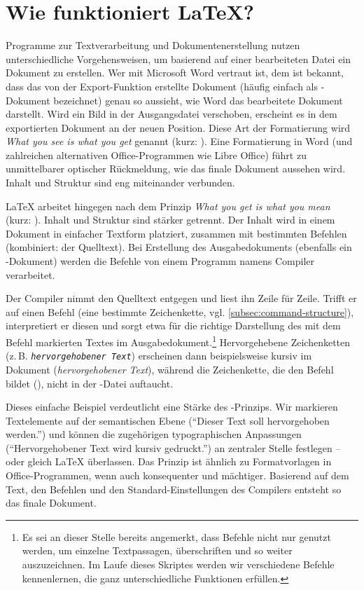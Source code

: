 \section{Wie funktioniert \LaTeX?}
\label{sec:latex-basic-functionality}

Programme zur Textverarbeitung und Dokumentenerstellung nutzen unterschiedliche Vorgehensweisen, um basierend auf einer bearbeiteten Datei ein Dokument zu erstellen.
Wer mit Microsoft Word vertraut ist, dem ist bekannt, dass das von der Export-Funktion erstellte Dokument (häufig einfach als -Dokument bezeichnet) genau so aussieht, wie Word das bearbeitete Dokument darstellt.
Wird ein Bild in der Ausgangsdatei verschoben, erscheint es in dem exportierten Dokument an der neuen Position.
Diese Art der Formatierung wird \emph{What you see is what you get} genannt (kurz: ).
Eine Formatierung in Word (und zahlreichen alternativen Office-Programmen wie Libre Office) führt zu unmittelbarer optischer Rückmeldung, wie das finale Dokument aussehen wird. 
Inhalt und Struktur sind eng miteinander verbunden.

\LaTeX{} arbeitet hingegen nach dem Prinzip \emph{What you get is what you mean} (kurz: ).
Inhalt und Struktur sind stärker getrennt.
Der Inhalt wird in einem Dokument in einfacher Textform platziert, zusammen mit bestimmten Befehlen (kombiniert: der Quelltext).
Bei Erstellung des Ausgabedokuments (ebenfalls ein -Dokument) werden die Befehle von einem Programm namens Compiler verarbeitet.

Der Compiler nimmt den Quelltext entgegen und liest ihn Zeile für Zeile.
Trifft er auf einen Befehl (eine bestimmte Zeichenkette, vgl. \cref{subsec:command-structure}), interpretiert er diesen und sorgt etwa für die richtige Darstellung des mit dem Befehl markierten Textes im Ausgabedokument.\footnote{Es sei an dieser Stelle bereits angemerkt, dass Befehle nicht nur genutzt werden, um einzelne Textpassagen, überschriften und so weiter auszuzeichnen. Im Laufe dieses Skriptes werden wir verschiedene Befehle kennenlernen, die ganz unterschiedliche Funktionen erfüllen.}
Hervorgehebene Zeichenketten (z.\,B. \texttt{\emph{hervorgehobener Text}}) erscheinen dann beispielsweise kursiv im Dokument (\emph{hervorgehobener Text}), während die Zeichenkette, die den Befehl bildet (\texttt{\emph{}}), nicht in der -Datei auftaucht.

Dieses einfache Beispiel verdeutlicht eine Stärke des -Prinzips. 
Wir markieren Textelemente auf der semantischen Ebene (\enquote{Dieser Text soll hervorgehoben werden.}) und können die zugehörigen typographischen Anpassungen (\enquote{Hervorgehobener Text wird kursiv gedruckt.}) an zentraler Stelle festlegen -- oder gleich \LaTeX{} überlassen.
Das Prinzip ist ähnlich zu Formatvorlagen in Office-Programmen, wenn auch konsequenter und mächtiger.
Basierend auf dem Text, den Befehlen und den Standard-Einstellungen des Compilers entsteht so das finale Dokument.

